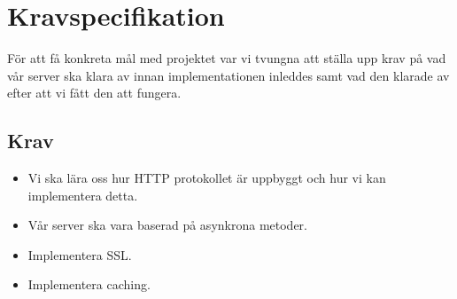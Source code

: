 \section{Kravspecifikation}
För att få konkreta mål med projektet var vi tvungna att ställa upp krav på vad vår server ska klara av innan implementationen inleddes samt vad den klarade av efter att vi fått den att fungera. 

\subsection{Krav}

\begin{itemize}

\item{Vi ska lära oss hur HTTP protokollet är uppbyggt och hur vi kan implementera detta.}
\item{Vår server ska vara baserad på asynkrona metoder.}
\item{Implementera SSL.}
\item{Implementera caching.}

\end{itemize}

